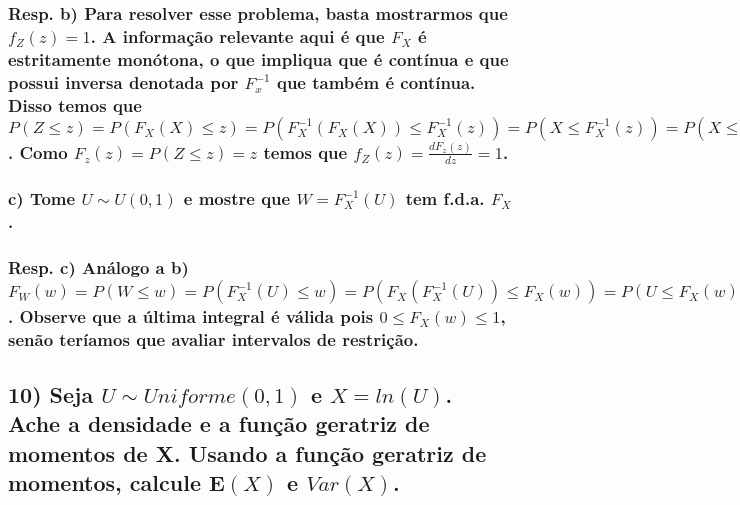 \documentclass[portuguese]{article}
\begin{document}
\subsubsection*{\textmd{Resp. b) Para resolver esse problema, basta mostrarmos que
$f_{Z}(z)=1$. A informação relevante aqui é que $F_{X}$ é estritamente
monótona, o que impliqua que é contínua e que possui inversa denotada
por $F_{x}^{-1}$ que também é contínua. Disso temos que $P(Z\leq z)=P(F_{X}(X)\leq z)=P(F_{X}^{-1}(F_{X}(X))\leq F_{X}^{-1}(z))=P(X\leq F_{X}^{-1}(z))=P(X\leq F_{X}^{-1}(z))=F_{X}(F_{X}^{-1}(z))=z$.
Como $F_{z}(z)=P(Z\leq z)=z$ temos que $f_{Z}(z)=\frac{dF_{z}(z)}{dz}=1$.}}


\subsubsection*{\textmd{c) Tome $U\sim U(0,1)$ e mostre que $W=F_{X}^{-1}(U)$ tem
f.d.a. $F_{X}$.}}


\subsubsection*{\textmd{Resp. c) Análogo a b)$F_{W}(w)=P(W\leq w)=P(F_{X}^{-1}(U)\leq w)=P(F_{X}(F_{X}^{-1}(U))\leq F_{X}(w))=P(U\leq F_{X}(w))=\int_{0}^{F_{X}(w)}1du=F_{x}(w)$.
Observe que a última integral é válida pois $0\leq F_{X}(w)\leq1$,
senão teríamos que avaliar intervalos de restrição.}}


\subsection*{\textcompwordmark{}}


\subsection*{\textmd{10) Seja $U\sim Uniforme(0,1)$ e $X=ln(U)$. Ache a densidade
e a função geratriz de momentos de X. Usando a função geratriz de
momentos, calcule $\mathbf{E}(X)$ e $Var(X)$.}}
\end{document}

